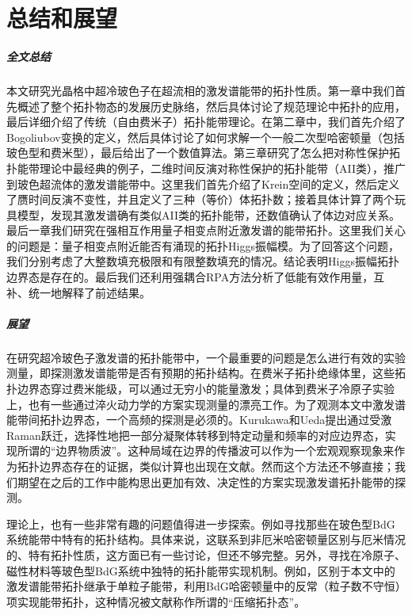 
\chapter{总结和展望}

\paragraph{全文总结}

本文研究光晶格中超冷玻色子在超流相的激发谱能带的拓扑性质。第一章中我们首先概述了整个拓扑物态的发展历史脉络，然后具体讨论了规范理论中拓扑的应用，最后详细介绍了传统（自由费米子）拓扑能带理论。在第二章中，我们首先介绍了Bogoliubov变换的定义，然后具体讨论了如何求解一个一般二次型哈密顿量（包括玻色型和费米型），最后给出了一个数值算法。第三章研究了怎么把对称性保护拓扑能带理论中最经典的例子，二维时间反演对称性保护的拓扑能带（AII类），推广到玻色超流体的激发谱能带中。这里我们首先介绍了Krein空间的定义，然后定义了赝时间反演不变性，并且定义了三种（等价）体拓扑数；接着具体计算了两个玩具模型，发现其激发谱确有类似AII类的拓扑能带，还数值确认了体边对应关系。最后一章我们研究在强相互作用量子相变点附近激发谱的能带拓扑。这里我们关心的问题是：量子相变点附近能否有涌现的拓扑Higgs振幅模。为了回答这个问题，我们分别考虑了大整数填充极限和有限整数填充的情况。结论表明Higgs振幅拓扑边界态是存在的。最后我们还利用强耦合RPA方法分析了低能有效作用量，互补、统一地解释了前述结果。

\paragraph{展望}

在研究超冷玻色子激发谱的拓扑能带中，一个最重要的问题是怎么进行有效的实验测量，即探测激发谱能带是否有预期的拓扑结构。在费米子拓扑绝缘体里，这些拓扑边界态穿过费米能级，可以通过无穷小的能量激发；具体到费米子冷原子实验上，也有一些通过淬火动力学的方案实现测量的漂亮工作\cite{Wang2017,Zhang2018,Sun2018a,Zhang2019}。为了观测本文中激发谱能带间拓扑边界态，一个高频的探测是必须的。Kurukawa和Ueda\cite{Furukawa2015}提出通过受激Raman跃迁，选择性地把一部分凝聚体转移到特定动量和频率的对应边界态，实现所谓的“边界物质波”。这种局域在边界的传播波可以作为一个宏观观察现象来作为拓扑边界态存在的证据，类似计算也出现在文献\cite{Xu2016}。然而这个方法还不够直接；我们期望在之后的工作中能构思出更加有效、决定性的方案实现激发谱拓扑能带的探测。

理论上，也有一些非常有趣的问题值得进一步探索。例如寻找那些在玻色型BdG系统能带中特有的拓扑结构。具体来说，这联系到非厄米哈密顿量区别与厄米情况的、特有拓扑性质，这方面已有一些讨论\cite{Lieu2018,Kawabata2018}，但还不够完整\cite{Lein2019}。另外，寻找在冷原子、磁性材料等玻色型BdG系统中独特的拓扑能带实现机制。例如，区别于本文中的激发谱能带拓扑继承于单粒子能带，利用BdG哈密顿量中的反常（粒子数不守恒）项实现能带拓扑\cite{McClarty2018}，这种情况被文献\cite{Wan2021}称作所谓的“压缩拓扑态”。